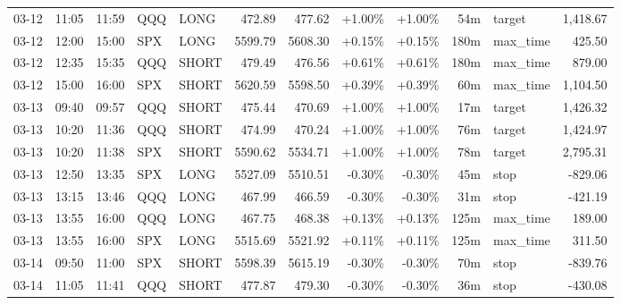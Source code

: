 \documentclass[11pt,a4paper,twoside]{article}
\begin{document}
\begin{center}
\begin{longtable}{>{\color{txtmain}}l l l l l r r r r r >{\color{txtmain}}l r}
03-12 & 11:05 & 11:59 & QQQ & LONG & 472.89 & 477.62 & \textcolor{wingreen}{+1.00\%} & \textcolor{wingreen}{+1.00\%} & 54m & target & \textcolor{wingreen}{1,418.67} \\
03-12 & 12:00 & 15:00 & SPX & LONG & 5599.79 & 5608.30 & \textcolor{wingreen}{+0.15\%} & \textcolor{wingreen}{+0.15\%} & 180m & max\_time & \textcolor{wingreen}{425.50} \\
03-12 & 12:35 & 15:35 & QQQ & SHORT & 479.49 & 476.56 & \textcolor{wingreen}{+0.61\%} & \textcolor{wingreen}{+0.61\%} & 180m & max\_time & \textcolor{wingreen}{879.00} \\
03-12 & 15:00 & 16:00 & SPX & SHORT & 5620.59 & 5598.50 & \textcolor{wingreen}{+0.39\%} & \textcolor{wingreen}{+0.39\%} & 60m & max\_time & \textcolor{wingreen}{1,104.50} \\
03-13 & 09:40 & 09:57 & QQQ & SHORT & 475.44 & 470.69 & \textcolor{wingreen}{+1.00\%} & \textcolor{wingreen}{+1.00\%} & 17m & target & \textcolor{wingreen}{1,426.32} \\
03-13 & 10:20 & 11:36 & QQQ & SHORT & 474.99 & 470.24 & \textcolor{wingreen}{+1.00\%} & \textcolor{wingreen}{+1.00\%} & 76m & target & \textcolor{wingreen}{1,424.97} \\
03-13 & 10:20 & 11:38 & SPX & SHORT & 5590.62 & 5534.71 & \textcolor{wingreen}{+1.00\%} & \textcolor{wingreen}{+1.00\%} & 78m & target & \textcolor{wingreen}{2,795.31} \\
03-13 & 12:50 & 13:35 & SPX & LONG & 5527.09 & 5510.51 & \textcolor{lossred}{-0.30\%} & \textcolor{lossred}{-0.30\%} & 45m & stop & \textcolor{lossred}{-829.06} \\
03-13 & 13:15 & 13:46 & QQQ & LONG & 467.99 & 466.59 & \textcolor{lossred}{-0.30\%} & \textcolor{lossred}{-0.30\%} & 31m & stop & \textcolor{lossred}{-421.19} \\
03-13 & 13:55 & 16:00 & QQQ & LONG & 467.75 & 468.38 & \textcolor{wingreen}{+0.13\%} & \textcolor{wingreen}{+0.13\%} & 125m & max\_time & \textcolor{wingreen}{189.00} \\
03-13 & 13:55 & 16:00 & SPX & LONG & 5515.69 & 5521.92 & \textcolor{wingreen}{+0.11\%} & \textcolor{wingreen}{+0.11\%} & 125m & max\_time & \textcolor{wingreen}{311.50} \\
03-14 & 09:50 & 11:00 & SPX & SHORT & 5598.39 & 5615.19 & \textcolor{lossred}{-0.30\%} & \textcolor{lossred}{-0.30\%} & 70m & stop & \textcolor{lossred}{-839.76} \\
03-14 & 11:05 & 11:41 & QQQ & SHORT & 477.87 & 479.30 & \textcolor{lossred}{-0.30\%} & \textcolor{lossred}{-0.30\%} & 36m & stop & \textcolor{lossred}{-430.08} \\

\end{longtable}
\end{center}
\end{document}
